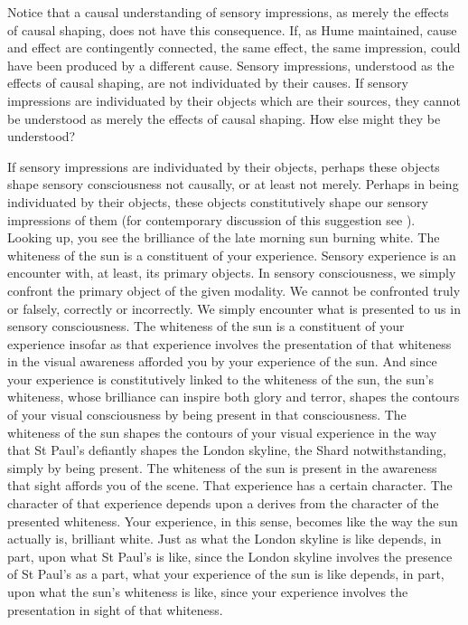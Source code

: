Notice that a causal understanding of sensory impressions, as merely the effects of causal shaping, does not have this consequence. If, as Hume maintained, cause and effect are contingently connected, the same effect, the same impression, could have been produced by a different cause. Sensory impressions, understood as the effects of causal shaping, are not individuated by their causes. If sensory impressions are individuated by their objects which are their sources, they cannot be understood as merely the effects of causal shaping. How else might they be understood?

If sensory impressions are individuated by their objects, perhaps these objects shape sensory consciousness not causally, or at least not merely. Perhaps in being individuated by their objects, these objects constitutively shape our sensory impressions of them (for contemporary discussion of this suggestion see \citealt{McDowell:1998vn,Martin:2004fj,Fish:2009fk,Kalderon:2011fk}). Looking up, you see the brilliance of the late morning sun burning white. The whiteness of the sun is a constituent of your experience. Sensory experience is an encounter with, at least, its primary objects. In sensory consciousness, we simply confront the primary object of the given modality. We cannot be confronted truly or falsely, correctly or incorrectly. We simply encounter what is presented to us in sensory consciousness. The whiteness of the sun is a constituent of your experience insofar as that experience involves the presentation of that whiteness in the visual awareness afforded you by your experience of the sun. And since your experience is constitutively linked to the whiteness of the sun, the sun's whiteness, whose brilliance can inspire both glory and terror, shapes the contours of your visual consciousness by being present in that consciousness. The whiteness of the sun shapes the contours of your visual experience in the way that St Paul's defiantly shapes the London skyline, the Shard notwithstanding, simply by being present. The whiteness of the sun is present in the awareness that sight affords you of the scene. That experience has a certain character. The character of that experience depends upon a derives from the character of the presented whiteness. Your experience, in this sense, becomes like the way the sun actually is, brilliant white. Just as what the London skyline is like depends, in part, upon what St Paul's is like, since the London skyline involves the presence of St Paul's as a part, what your experience of the sun is like depends, in part, upon what the sun's whiteness is like, since your experience involves the presentation in sight of that whiteness.

